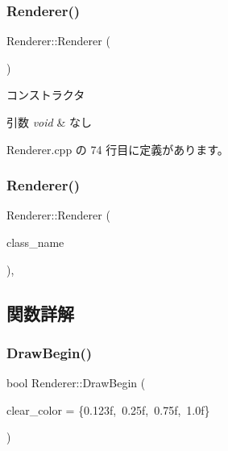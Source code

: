 \subsubsection{\texorpdfstring{Renderer()}{Renderer()}\hspace{0.1cm}{\footnotesize\ttfamily [1/2]}}
{\footnotesize\ttfamily Renderer\+::\+Renderer (\begin{DoxyParamCaption}{ }\end{DoxyParamCaption})\hspace{0.3cm}{\ttfamily [private]}}



コンストラクタ 


\begin{DoxyParams}{引数}
{\em void} & なし \\
\hline
\end{DoxyParams}


 Renderer.\+cpp の 74 行目に定義があります。

\mbox{\label{class_renderer_a1e7732f4c952f3c13d9bb03a7510b7aa}} 
\subsubsection{\texorpdfstring{Renderer()}{Renderer()}\hspace{0.1cm}{\footnotesize\ttfamily [2/2]}}
{\footnotesize\ttfamily Renderer\+::\+Renderer (\begin{DoxyParamCaption}\item[{const \mbox{\hyperlink{class_renderer}{Renderer}} \&}]{class\+\_\+name }\end{DoxyParamCaption})\hspace{0.3cm}{\ttfamily [private]}, {\ttfamily [delete]}}



\subsection{関数詳解}
\mbox{\label{class_renderer_a15d1b99317779905ba4b529d871a1845}} 
\subsubsection{\texorpdfstring{Draw\+Begin()}{DrawBegin()}}
{\footnotesize\ttfamily bool Renderer\+::\+Draw\+Begin (\begin{DoxyParamCaption}\item[{\mbox{\hyperlink{_vector3_d_8h_a680c30c4a07d86fe763c7e01169cd6cc}{X\+Color4}}}]{clear\+\_\+color = {\ttfamily \{0.123f,~0.25f,~0.75f,~1.0f\}} }\end{DoxyParamCaption})}




